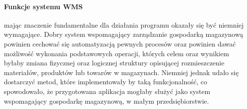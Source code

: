 		\paragraph{Funkcje systemu WMS} mając znaczenie fundamentalne dla działania programu okazały
		się być niemniej wymagające. Dobry system wspomagający zarządzanie gospodarką magazynową powinien
		cechować się automatyzacją pewnych procesów oraz powinien dawać możliwość wykonania
		podstawowych operacji, których celem oraz wynikiem byłaby zmiana fizycznej oraz logicznej struktury
		opisującej rozmieszczenie materiałów, produktów lub towarów w magazynach.
		Niemniej jednak udało się dostarczyć metod, które implementowały by taką funkcjonalność, co spowodowało,
		że przygotowana aplikacja mogłaby służyć jako system wspomagający gospodarkę magazynową, w 
		małym przedsiębiorstwie.